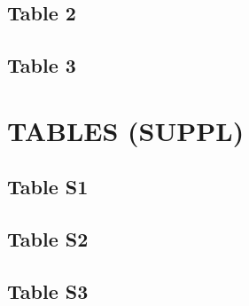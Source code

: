 \documentclass[
]{article}
\begin{document}
\clearpage

\hypertarget{table-2}{%
\subsection{Table 2}\label{table-2}}

\clearpage

\hypertarget{table-3}{%
\subsection{Table 3}\label{table-3}}

\clearpage

\hypertarget{tables-suppl}{%
\section{TABLES (SUPPL)}\label{tables-suppl}}

\hypertarget{table-s1}{%
\subsection{Table S1}\label{table-s1}}

\clearpage

\hypertarget{table-s2}{%
\subsection{Table S2}\label{table-s2}}

\clearpage

\hypertarget{table-s3}{%
\subsection{Table S3}\label{table-s3}}

\clearpage
\end{document}
